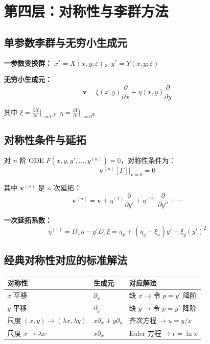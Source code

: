 \section{第四层：对称性与李群方法}

\subsection{单参数李群与无穷小生成元}

\textbf{一参数变换群：} $x^* = X(x,y;\varepsilon)$，$y^* = Y(x,y;\varepsilon)$

\textbf{无穷小生成元：}
\[
\mathbf{v} = \xi(x,y)\frac{\partial}{\partial x} + \eta(x,y)\frac{\partial}{\partial y}
\]

其中 $\xi = \frac{\partial X}{\partial \varepsilon}\big|_{\varepsilon=0}$，$\eta = \frac{\partial Y}{\partial \varepsilon}\big|_{\varepsilon=0}$。

\subsection{对称性条件与延拓}

对 $n$ 阶 ODE $F(x, y, y', \ldots, y^{(n)}) = 0$，对称性条件为：
\[
\mathbf{v}^{(n)}[F]\big|_{F=0} = 0
\]

其中 $\mathbf{v}^{(n)}$ 是 $n$ 次延拓：
\[
\mathbf{v}^{(n)} = \mathbf{v} + \eta^{(1)}\frac{\partial}{\partial y'} + \eta^{(2)}\frac{\partial}{\partial y''} + \cdots
\]

\textbf{一次延拓系数：}
\[
\eta^{(1)} = D_x\eta - y'D_x\xi = \eta_x + (\eta_y - \xi_x)y' - \xi_y(y')^2
\]

\subsection{经典对称性对应的标准解法}

\begin{center}
\begin{tabular}{p{4cm}p{3.5cm}p{4cm}}
\toprule
\textbf{对称性} & \textbf{生成元} & \textbf{对应解法} \\
\midrule
$x$ 平移 & $\partial_x$ & 缺 $x$ → 令 $p = y'$ 降阶 \\
$y$ 平移 & $\partial_y$ & 缺 $y$ → 令 $p = y'$ 降阶 \\
尺度 $(x,y)\to(\lambda x, \lambda y)$ & $x\partial_x + y\partial_y$ & 齐次方程 → $u = y/x$ \\
尺度 $x \to \lambda x$ & $x\partial_x$ & Euler 方程 → $t = \ln x$ \\
\bottomrule
\end{tabular}
\end{center}

